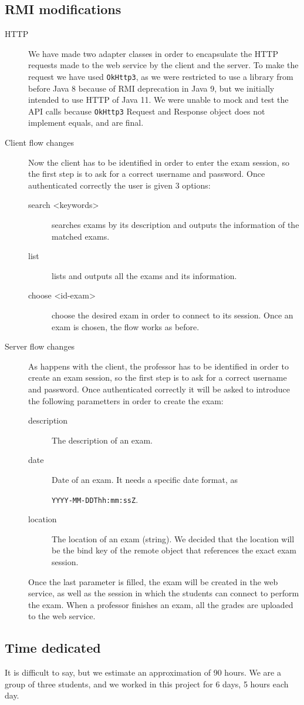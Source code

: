 \documentclass[11pt]{article}
\begin{document}
\subsection{RMI modifications}
\label{sec:org848e0b6}
\begin{description}
\item[{HTTP}] We have made two adapter classes in order to encapsulate the
HTTP requests made to the web service by the client and the server. To
make the request we have used \texttt{OkHttp3}, as we were restricted to use a
library from before Java 8 because of RMI deprecation in Java 9, but we initially intended
to use HTTP of Java 11. We were unable
to mock and test the API calls because \texttt{OkHttp3} Request and Response
object does not implement equals, and are final.

\item[{Client flow changes}] Now the client has to be identified in order to
enter the exam session, so the first step is to ask for a correct username
and password. Once authenticated correctly the user is given 3
options:

\begin{description}
\item[{search <keywords> }] searches exams by its description and outputs
the information of the matched exams.
\item[{list}] lists and outputs all the exams and its information.
\item[{choose <id-exam>}] choose the desired exam in order to connect to
its session. Once an exam is chosen, the flow works as before.
\end{description}

\item[{Server flow changes}] As happens with the client, the professor has
to be identified in order to create an exam session, so the first step
is to ask for a correct username and password. Once authenticated
correctly it will be asked to introduce the following parametters in
order to create the exam:

\begin{description}
\item[{description}] The description of an exam.
\item[{date}] Date of an exam. It needs a specific date format, as

\texttt{YYYY-MM-DDThh:mm:ssZ}.

\item[{location}] The location of an exam (string). We decided that the
location will be the bind key of the remote object that references
the exact exam session. 
\end{description}
Once the last parameter is filled, the
exam will be created in the web service, as well as the session in
which the students can connect to perform the exam. When a
professor finishes an exam, all the grades are uploaded to the web
service.
\end{description}

\subsection{Time dedicated}
\label{sec:org2cca440}
It is difficult to say, but we estimate an approximation of 90 hours. We
are a group of three students, and we worked in this project for 6 days,
5 hours each day.
\end{document}
